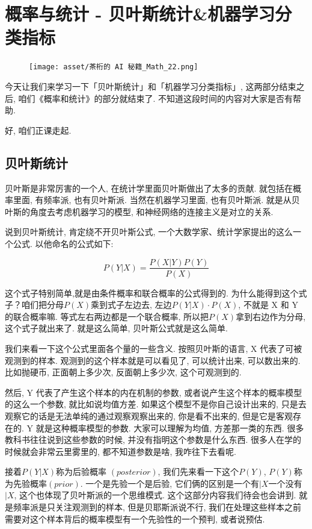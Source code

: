 \chapter{概率与统计 - 贝叶斯统计\&机器学习分类指标}
\begin{figure}[ht]
  \centering
  \texttt{[image: asset/茶桁的 AI 秘籍\_Math\_22.png]}
\end{figure}
\newpage


今天让我们来学习一下「贝叶斯统计」和「机器学习分类指标」, 这两部分结束之后, 咱们《概率和统计》的部分就结束了. 不知道这段时间的内容对大家是否有帮助. 

好, 咱们正课走起. 

\section{贝叶斯统计}

贝叶斯是非常厉害的一个人, 在统计学里面贝叶斯做出了太多的贡献. 就包括在概率里面, 有频率派, 也有贝叶斯派. 当然在机器学习里面, 也有贝叶斯派. 就是从贝叶斯的角度去考虑机器学习的模型, 和神经网络的连接主义是对立的关系. 

说到贝叶斯统计, 肯定绕不开贝叶斯公式, 一个大数学家、统计学家提出的这么一个公式. 以他命名的公式如下: 

\[P(Y|X) = \frac{P(X|Y)P(Y)}{P(X)}\]

这个式子特别简单,就是由条件概率和联合概率的公式得到的. 为什么能得到这个式子？咱们把分母$P(X)$乘到式子左边去, 左边$P(Y|X) \cdot P(X)$, 不就是 X 和 Y 的联合概率嘛. 等式左右两边都是一个联合概率, 所以把$P(X)$拿到右边作为分母, 这个式子就出来了. 就是这么简单, 贝叶斯公式就是这么简单. 

我们来看一下这个公式里面各个量的一些含义. 按照贝叶斯的语言, X 代表了可被观测到的样本. 观测到的这个样本就是可以看见了, 可以统计出来, 可以数出来的. 比如抛硬币, 正面朝上多少次, 反面朝上多少次, 这个可观测到的. 

然后, Y 代表了产生这个样本的内在机制的参数, 或者说产生这个样本的概率模型的这么一个参数, 就比如说均值方差. 如果这个模型不是你自己设计出来的, 只是去观察它的话是无法单纯的通过观察观察出来的, 你是看不出来的, 但是它是客观存在的. Y 就是这种概率模型的参数. 大家可以理解为均值, 方差那一类的东西. 很多教科书往往说到这些参数的时候, 并没有指明这个参数是什么东西. 很多人在学的时候就会非常云里雾里的, 都不知道参数是啥, 我咋往下去看呢. 

接着$P(Y|X)$称为后验概率 $(\mathord{posterior})$, 我们先来看一下这个$P(Y)$, $P(Y)$称为先验概率$(\mathord{prior})$. 一个是先验一个是后验, 它们俩的区别是一个有$|X$一个没有$|X$, 这个也体现了贝叶斯派的一个思维模式. 这个这部分内容我们待会也会讲到. 就是频率派是只关注观测到的样本, 但是贝耶斯派说不行, 我们在处理这些样本之前需要对这个样本背后的概率模型有一个先验性的一个预判, 或者说预估. 

